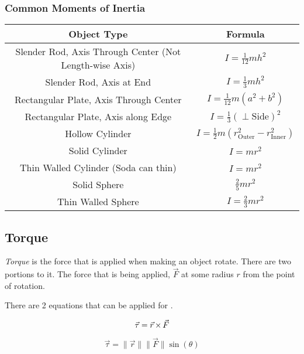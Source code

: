 \subsubsection{Common Moments of Inertia}\label{subsubsec:Common Moments of Inertia}
\begin{table}[h!]
  \centering
  \renewcommand{\arraystretch}{1.5}
  \begin{tabular}{cc}
    Object Type & \nameref{def:Moment of Inertia} Formula \\ \hline
    Slender Rod, Axis Through Center (Not Length-wise Axis) & $I = \frac{1}{12} m h^{2}$ \\ \hline
    Slender Rod, Axis at End & $I = \frac{1}{3} m h^{2}$ \\ \hline
    Rectangular Plate, Axis Through Center & $I = \frac{1}{12} m \left( a^{2} + b^{2} \right)$ \\ \hline
    Rectangular Plate, Axis along Edge & $I = \frac{1}{3} \left( \perp \text{Side} \right)^{2}$ \\ \hline
    Hollow Cylinder & $I = \frac{1}{2} m \left( r_{\text{Outer}}^{2} - r_{\text{Inner}}^{2} \right)$ \\ \hline
    Solid Cylinder & $I = m r^{2}$ \\ \hline
    Thin Walled Cylinder (Soda can thin) & $I = m r^{2}$ \\ \hline
    Solid Sphere & $\frac{2}{5} m r^{2}$ \\ \hline
    Thin Walled Sphere & $I = \frac{2}{3} m r^{2}$ \\ \hline
  \end{tabular}
\end{table}

\subsection{Torque}\label{subsec:Torque}
\begin{definition}[Torque]\label{def:Torque}
  \emph{Torque} is the force that is applied when making an object rotate.
  There are two portions to it.
  The force that is being applied, $\vec{F}$ at some radius $r$ from the point of rotation.

  There are 2 equations that can be applied for .

  \begin{equation}\label{eq:Torque Cross Product}
    \vec{\tau} = \vec{r} \operatorname{\times} \vec{F}
  \end{equation}

  \begin{equation}\label{eq:Torque Magnitudes}
    \vec{\tau} = \lVert \vec{r} \rVert \lVert \vec{F} \rVert \sin (\theta)
  \end{equation}
\end{definition}


